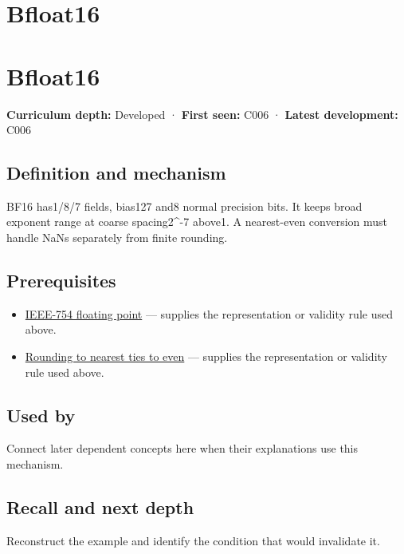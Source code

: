 \hypertarget{appendix-18b8dd966b5d}{}
\section*{Bfloat16}
\section{Bfloat16}\label{bfloat16}

\textbf{Curriculum depth:} Developed · \textbf{First seen:} C006 · \textbf{Latest development:} C006

\subsection{Definition and mechanism}\label{definition-and-mechanism}

BF16 has1/8/7 fields, bias127 and8 normal precision bits. It keeps broad exponent range at coarse spacing2\^{}-7 above1. A nearest-even conversion must handle NaNs separately from finite rounding.

\subsection{Prerequisites}\label{prerequisites}

\begin{itemize}
\tightlist
\item
  \hyperref[appendix-343615f49ddf]{IEEE-754 floating point} --- supplies the representation or validity rule used above.
\item
  \hyperref[appendix-614afe1de592]{Rounding to nearest ties to even} --- supplies the representation or validity rule used above.
\end{itemize}

\subsection{Used by}\label{used-by}

Connect later dependent concepts here when their explanations use this mechanism.

\subsection{Recall and next depth}\label{recall-and-next-depth}

Reconstruct the example and identify the condition that would invalidate it.

